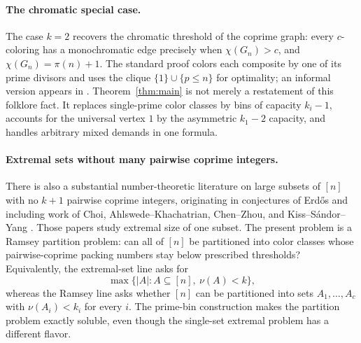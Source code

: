 \documentclass[11pt]{article}
\theoremstyle{plain}
\theoremstyle{definition}
\theoremstyle{remark}
\begin{document}
\paragraph{The chromatic special case.}
The case $k=2$ recovers the chromatic threshold of the coprime graph:
every $c$-coloring has a monochromatic edge precisely when
$\chi(G_n)>c$, and $\chi(G_n)=\pi(n)+1$.  The standard proof colors each
composite by one of its prime divisors and uses the clique
$\{1\}\cup\{p\le n\}$ for optimality; an informal version appears in
\cite{lavrov-mse}.  Theorem~\ref{thm:main} is not merely a restatement of
this folklore fact.  It replaces single-prime color classes by bins of
capacity $k_i-1$, accounts for the universal vertex $1$ by the asymmetric
$k_1-2$ capacity, and handles arbitrary mixed demands in one formula.

\paragraph{Extremal sets without many pairwise coprime integers.}
There is also a substantial number-theoretic literature on large subsets of
$[n]$ with no $k+1$ pairwise coprime integers, originating in conjectures of
Erd\H{o}s and including work of Choi, Ahlswede--Khachatrian, Chen--Zhou, and
Kiss--S\'andor--Yang
\cite{erdos1962,choi1973,ahlswede-khachatrian1994,chen-zhou,kiss-sandor-yang}.
Those papers study extremal size of one subset.  The present problem is a
Ramsey partition problem: can all of $[n]$ be partitioned into color classes
whose pairwise-coprime packing numbers stay below prescribed thresholds?
Equivalently, the extremal-set line asks for
\[
  \max\{|A|:A\subseteq[n],\ \nu(A)<k\},
\]
whereas the Ramsey line asks whether $[n]$ can be partitioned into sets
$A_1,\ldots,A_c$ with $\nu(A_i)<k_i$ for every $i$.  The prime-bin
construction makes the partition problem exactly soluble, even though the
single-set extremal problem has a different flavor.
\end{document}
